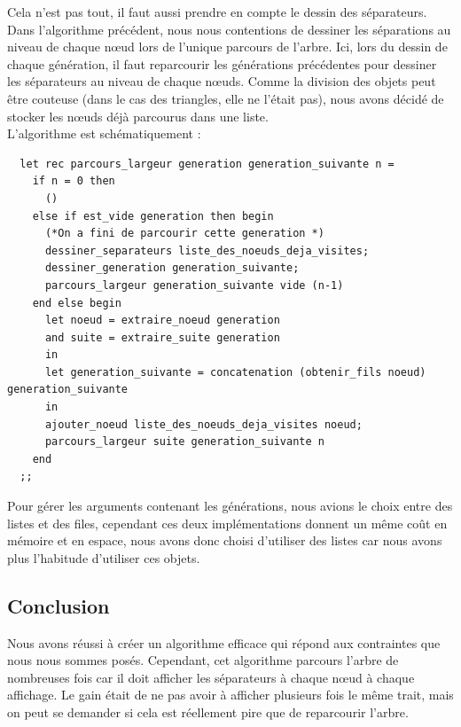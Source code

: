 \documentclass[a4paper,11pt]{article}
\begin{document}
Cela n'est pas tout, il faut aussi prendre en compte le dessin des séparateurs. Dans
l'algorithme précédent, nous nous contentions de dessiner les séparations au niveau de chaque
nœud lors de l'unique parcours de l'arbre. Ici, lors du dessin de chaque génération, il
faut reparcourir les générations précédentes pour dessiner les séparateurs au niveau de
chaque nœuds. Comme la division des objets peut être couteuse (dans le cas des triangles, elle
ne l'était pas), nous avons décidé de stocker les nœuds déjà parcourus dans une liste.\\

L'algorithme est schématiquement :

\begin{lstlisting}
  let rec parcours_largeur generation generation_suivante n =
    if n = 0 then
      ()
    else if est_vide generation then begin
      (*On a fini de parcourir cette generation *)
      dessiner_separateurs liste_des_noeuds_deja_visites;
      dessiner_generation generation_suivante;
      parcours_largeur generation_suivante vide (n-1)
    end else begin
      let noeud = extraire_noeud generation
      and suite = extraire_suite generation
      in
      let generation_suivante = concatenation (obtenir_fils noeud) generation_suivante
      in
      ajouter_noeud liste_des_noeuds_deja_visites noeud;
      parcours_largeur suite generation_suivante n
    end
  ;;
\end{lstlisting}
Pour gérer les arguments contenant les générations, nous avions le choix entre des listes et
des files, cependant ces deux implémentations donnent un même coût en mémoire et en espace,
nous avons donc choisi d'utiliser des listes car nous avons plus l'habitude d'utiliser ces
objets.\\

\subsection{Conclusion}
Nous avons réussi à créer un algorithme efficace qui répond aux contraintes que nous nous
sommes posés. Cependant, cet algorithme parcours l'arbre de nombreuses fois car il doit
afficher les séparateurs à chaque nœud à chaque affichage. Le gain était de ne pas avoir
à afficher plusieurs fois le même trait, mais on peut se demander si cela est réellement pire
que de reparcourir l'arbre.
\end{document}
